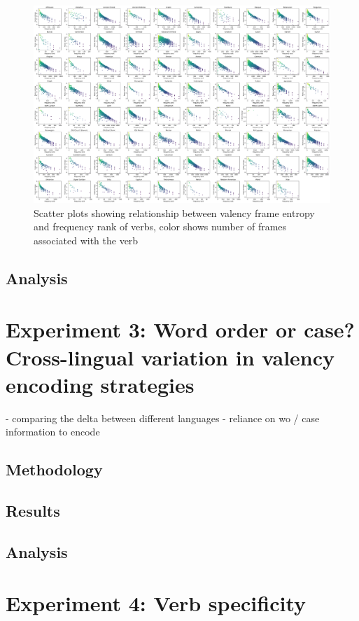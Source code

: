 \begin{figure}
  \centering
  \includegraphics[width=\textwidth]{figures/joint_entropy_freq.pdf}
  \caption{Scatter plots showing relationship between valency frame entropy and frequency rank of verbs, color shows number of frames associated with the verb}
  \label{fig:joint_entropy_freq}
\end{figure}

\subsection{Analysis}

\section{Experiment 3: Word order or case? Cross-lingual variation in valency encoding strategies}\label{sec:exp3-ablation}

- comparing the delta between different languages
- reliance on wo / case information to encode

\subsection{Methodology}
\subsection{Results}
\subsection{Analysis}

\section{Experiment 4: Verb specificity}\label{sec:exp4-verb-specificity}

